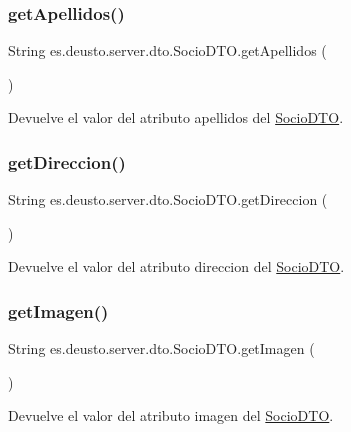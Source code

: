 \subsubsection{\texorpdfstring{getApellidos()}{getApellidos()}}
{\footnotesize\ttfamily String es.\+deusto.\+server.\+dto.\+Socio\+D\+T\+O.\+get\+Apellidos (\begin{DoxyParamCaption}{ }\end{DoxyParamCaption})}

Devuelve el valor del atributo apellidos del \mbox{\hyperlink{classes_1_1deusto_1_1server_1_1dto_1_1_socio_d_t_o}{Socio\+D\+TO}}. \mbox{\label{classes_1_1deusto_1_1server_1_1dto_1_1_socio_d_t_o_aecd5084a3104808141cf0e3f2bd71262}} 
\subsubsection{\texorpdfstring{getDireccion()}{getDireccion()}}
{\footnotesize\ttfamily String es.\+deusto.\+server.\+dto.\+Socio\+D\+T\+O.\+get\+Direccion (\begin{DoxyParamCaption}{ }\end{DoxyParamCaption})}

Devuelve el valor del atributo direccion del \mbox{\hyperlink{classes_1_1deusto_1_1server_1_1dto_1_1_socio_d_t_o}{Socio\+D\+TO}}. \mbox{\label{classes_1_1deusto_1_1server_1_1dto_1_1_socio_d_t_o_a8d119e5a035540c15c388259e4e81005}} 
\subsubsection{\texorpdfstring{getImagen()}{getImagen()}}
{\footnotesize\ttfamily String es.\+deusto.\+server.\+dto.\+Socio\+D\+T\+O.\+get\+Imagen (\begin{DoxyParamCaption}{ }\end{DoxyParamCaption})}

Devuelve el valor del atributo imagen del \mbox{\hyperlink{classes_1_1deusto_1_1server_1_1dto_1_1_socio_d_t_o}{Socio\+D\+TO}}. \mbox{\label{classes_1_1deusto_1_1server_1_1dto_1_1_socio_d_t_o_ac7fb724e7d2c4f2322ef53de75b79234}} 
